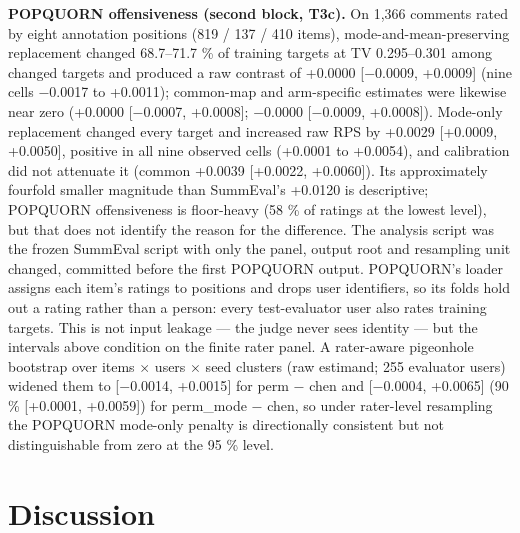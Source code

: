 \documentclass[10pt]{article}
\begin{document}
\textbf{POPQUORN offensiveness (second block, T3c).} On 1,366 comments rated by eight annotation positions (819 / 137 / 410 items), mode-and-mean-preserving replacement changed 68.7--71.7 \% of training targets at TV 0.295--0.301 among changed targets and produced a raw contrast of +0.0000 {[}$-$0.0009, +0.0009{]} (nine cells $-$0.0017 to +0.0011); common-map and arm-specific estimates were likewise near zero (+0.0000 {[}$-$0.0007, +0.0008{]}; $-$0.0000 {[}$-$0.0009, +0.0008{]}). Mode-only replacement changed every target and increased raw RPS by +0.0029 {[}+0.0009, +0.0050{]}, positive in all nine observed cells (+0.0001 to +0.0054), and calibration did not attenuate it (common +0.0039 {[}+0.0022, +0.0060{]}). Its approximately fourfold smaller magnitude than SummEval's +0.0120 is descriptive; POPQUORN offensiveness is floor-heavy (58 \% of ratings at the lowest level), but that does not identify the reason for the difference. The analysis script was the frozen SummEval script with only the panel, output root and resampling unit changed, committed before the first POPQUORN output. POPQUORN's loader assigns each item's ratings to positions and drops user identifiers, so its folds hold out a rating rather than a person: every test-evaluator user also rates training targets. This is not input leakage --- the judge never sees identity --- but the intervals above condition on the finite rater panel. A rater-aware pigeonhole bootstrap over items $\times$ users $\times$ seed clusters (raw estimand; 255 evaluator users) widened them to {[}$-$0.0014, +0.0015{]} for perm $-$ chen and {[}$-$0.0004, +0.0065{]} (90 \% {[}+0.0001, +0.0059{]}) for perm\_mode $-$ chen, so under rater-level resampling the POPQUORN mode-only penalty is directionally consistent but not distinguishable from zero at the 95 \% level.

\section{Discussion}
\end{document}
